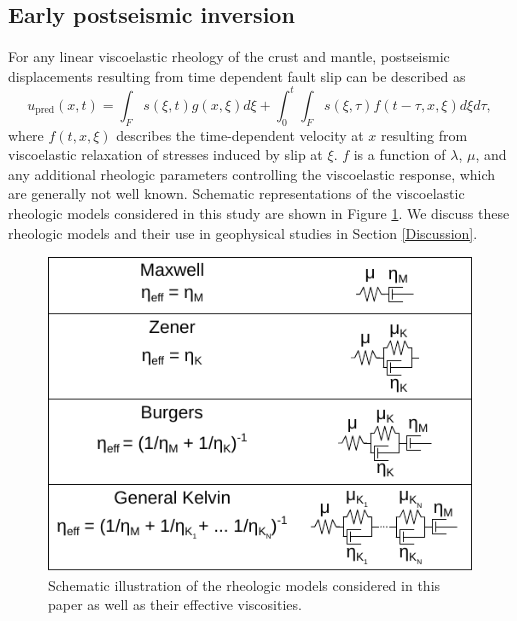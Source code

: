 \subsection{Early postseismic inversion}\label{ch3:sec:InitialInversion}
For any linear viscoelastic rheology of the crust and mantle, postseismic displacements resulting from time dependent fault slip can be described as  
\begin{equation}\label{GeneralForward}
  u_\mathrm{pred}(x,t) = \int_F s(\xi,t)g(x,\xi)d\xi + 
           \int_0^t\int_F s(\xi,\tau) f(t-\tau,x,\xi) d\xi d\tau,
\end{equation}
where $f(t,x,\xi)$ describes the time-dependent velocity at $x$ resulting from viscoelastic relaxation of stresses induced by slip at $\xi$. $f$ is a function of $\lambda$, $\mu$, and any additional rheologic parameters controlling the viscoelastic response, which are generally not well known. Schematic representations of the viscoelastic rheologic models considered in this study are shown in Figure \ref{ch3:fig:Rheology}.  We discuss these rheologic models and their use in geophysical studies in Section \ref{Discussion}. 

\begin{figure}
\includegraphics[scale=1.0]{ch3/figures/2016jb013114-f08}
\caption{Schematic illustration of the rheologic models considered in this paper as well as their effective viscosities.}
\label{ch3:fig:Rheology}
\end{figure}

